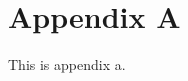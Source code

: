 \clearpage
\setcounter{page}{1}
\maketitlesupplementary


\section{Appendix A}
\label{sec:appendixa}
This is appendix a.